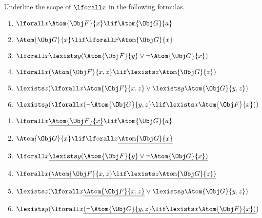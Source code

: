 \documentclass[../../../../include/open-logic-section]{subfiles}
\begin{document}


\begin{prob}[Scope]
Underline the scope of $\lforall x$ in the following
formulas.\label{exer:Underline-the-scope}
\begin{enumerate}
\item $\lforall x\Atom{\Obj F}{x}\lif \Atom{\Obj G}{a}$
\item $\Atom{\Obj G}{x}\lif\lforall x\Atom{\Obj G}{x}$
\item $\lforall x\lexists y(\Atom{\Obj F}{y}\lor\lnot \Atom{\Obj G}{x})$
\item $\lforall x(\Atom{\Obj F}{x,z}\lif\lexists z\Atom{\Obj G}{z})$
\item $\lexists z(\lforall x\Atom{\Obj F}{x,z}\lor\lexists y\Atom{\Obj G}{y,z})$
\item $\lexists y(\lforall x(\lnot \Atom{\Obj G}{y,z}\lif\lexists x\Atom{\Obj F}{x}))$
\end{enumerate}
\begin{ans}
\begin{enumerate}
\item $\lforall x\underline{\Atom{\Obj F}{x}}\lif \Atom{\Obj G}{a}$
\item $\Atom{\Obj G}{x}\lif\lforall x\underline{\Atom{\Obj G}{x}}$
\item $\lforall x\underline{\lexists y(\Atom{\Obj F}{y}\lor\lnot \Atom{\Obj G}{x})}$
\item $\lforall x\underline{(\Atom{\Obj F}{x,z}\lif\lexists z\Atom{\Obj G}{z})}$
\item $\lexists z(\lforall x\underline{\Atom{\Obj F}{x,z}}\lor\lexists y\Atom{\Obj G}{y,z})$
\item $\lexists y(\lforall x\underline{(\lnot \Atom{\Obj G}{y,z}\lif\lexists x\Atom{\Obj F}{x})})$
\end{enumerate}
\end{ans}
\end{prob}
\end{document}
